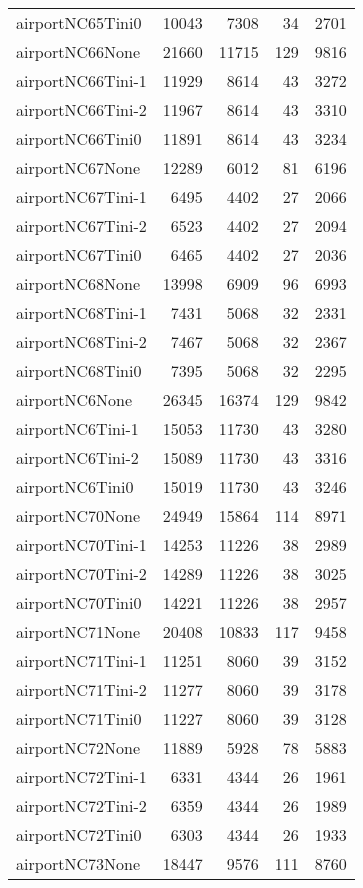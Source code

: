 \begin{longtable}{lrrrr}
airportNC65Tini0 & 10043 & 7308 & 34 & 2701 \\
airportNC66None & 21660 & 11715 & 129 & 9816 \\
airportNC66Tini-1 & 11929 & 8614 & 43 & 3272 \\
airportNC66Tini-2 & 11967 & 8614 & 43 & 3310 \\
airportNC66Tini0 & 11891 & 8614 & 43 & 3234 \\
airportNC67None & 12289 & 6012 & 81 & 6196 \\
airportNC67Tini-1 & 6495 & 4402 & 27 & 2066 \\
airportNC67Tini-2 & 6523 & 4402 & 27 & 2094 \\
airportNC67Tini0 & 6465 & 4402 & 27 & 2036 \\
airportNC68None & 13998 & 6909 & 96 & 6993 \\
airportNC68Tini-1 & 7431 & 5068 & 32 & 2331 \\
airportNC68Tini-2 & 7467 & 5068 & 32 & 2367 \\
airportNC68Tini0 & 7395 & 5068 & 32 & 2295 \\
airportNC6None & 26345 & 16374 & 129 & 9842 \\
airportNC6Tini-1 & 15053 & 11730 & 43 & 3280 \\
airportNC6Tini-2 & 15089 & 11730 & 43 & 3316 \\
airportNC6Tini0 & 15019 & 11730 & 43 & 3246 \\
airportNC70None & 24949 & 15864 & 114 & 8971 \\
airportNC70Tini-1 & 14253 & 11226 & 38 & 2989 \\
airportNC70Tini-2 & 14289 & 11226 & 38 & 3025 \\
airportNC70Tini0 & 14221 & 11226 & 38 & 2957 \\
airportNC71None & 20408 & 10833 & 117 & 9458 \\
airportNC71Tini-1 & 11251 & 8060 & 39 & 3152 \\
airportNC71Tini-2 & 11277 & 8060 & 39 & 3178 \\
airportNC71Tini0 & 11227 & 8060 & 39 & 3128 \\
airportNC72None & 11889 & 5928 & 78 & 5883 \\
airportNC72Tini-1 & 6331 & 4344 & 26 & 1961 \\
airportNC72Tini-2 & 6359 & 4344 & 26 & 1989 \\
airportNC72Tini0 & 6303 & 4344 & 26 & 1933 \\
airportNC73None & 18447 & 9576 & 111 & 8760 \\

\end{longtable}
